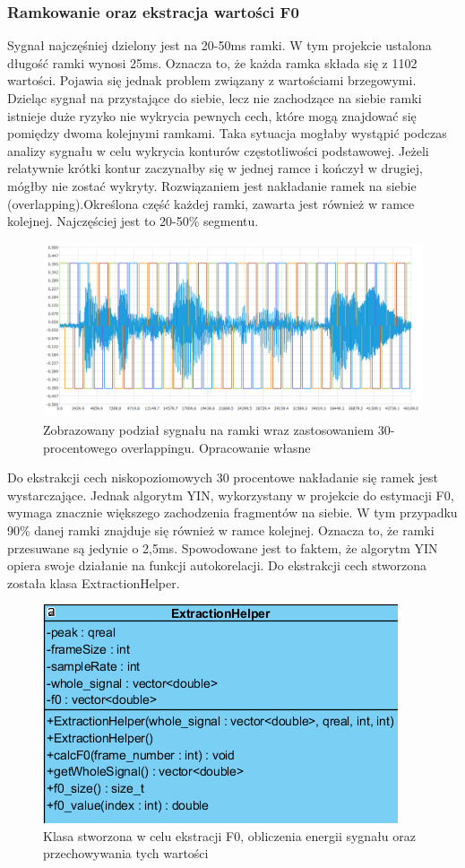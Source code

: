 \documentclass[a4paper,12 pt]{article}
\begin{document}
\subsubsection{Ramkowanie oraz ekstracja wartości F0}
Sygnał najczęśniej dzielony jest na 20-50ms ramki. W tym projekcie ustalona długość ramki wynosi 25ms. Oznacza to, że każda ramka składa się z 1102 wartości.
Pojawia się jednak problem związany z wartościami brzegowymi. Dzieląc sygnał na przystające do siebie, lecz nie zachodzące na siebie ramki istnieje duże ryzyko nie wykrycia pewnych cech, które mogą znajdować się pomiędzy dwoma kolejnymi ramkami. 
Taka sytuacja mogłaby wystąpić podczas analizy sygnału w celu wykrycia konturów częstotliwości podstawowej. Jeżeli relatywnie krótki kontur zaczynałby się w jednej ramce i kończył w drugiej, mógłby nie zostać wykryty.
Rozwiązaniem jest nakładanie ramek na siebie (overlapping).Określona część każdej ramki, zawarta jest również w ramce kolejnej. Najczęściej jest to 20-50\% segmentu.
\begin{figure}[h]

\includegraphics[scale=0.7]{overlapping.png}
\caption{Zobrazowany podział sygnału na ramki wraz zastosowaniem 30-procentowego overlappingu. Opracowanie własne}
\end{figure}
\FloatBarrier
Do ekstrakcji cech niskopoziomowych 30 procentowe nakładanie się ramek jest wystarczające. Jednak algorytm YIN, wykorzystany w projekcie do estymacji F0, wymaga znacznie większego zachodzenia fragmentów na siebie. W tym przypadku 90\% danej ramki znajduje się również w ramce kolejnej.
Oznacza to, że ramki przesuwane są jedynie o 2,5ms. Spowodowane jest to faktem, że algorytm YIN opiera swoje działanie na funkcji autokorelacji.
Do ekstrakcji cech stworzona została klasa ExtractionHelper.
\FloatBarrier
\begin{figure}[h]
\centering
\includegraphics[scale=0.9]{featuresExtractor.png}
\caption{Klasa stworzona w celu ekstracji F0, obliczenia energii sygnału oraz przechowywania tych wartości}
\end{figure}
\end{document}

